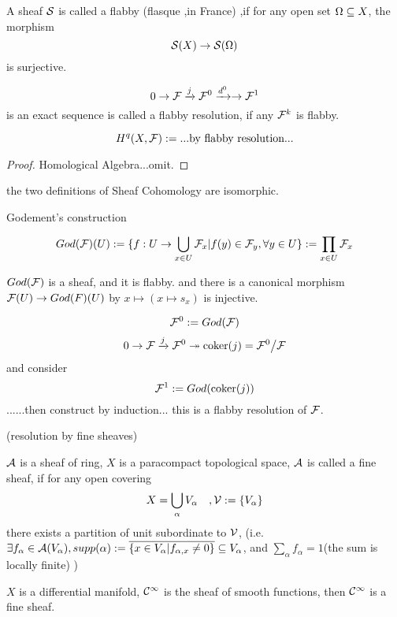 \begin{definition}
A sheaf $\mathcal{S}$ is called a flabby (flasque ,in France) ,if
for any open set $\Omega\subseteq X$, the morphism
$$\mathcal{S}(X)\to\mathcal{S}(\Omega)$$
is surjective.
\end{definition}

\begin{definition}
$$0\to\mathcal{F}\xrightarrow{j}\mathcal{F}^0\xrightarrow{d^0}\to\mathcal{F}^1$$
is an exact sequence is called a flabby resolution, if
any $\mathcal{F}^k$ is flabby.
\end{definition}

\begin{definition}
$$H^q(X,\mathcal{F}):=...\text{by flabby resolution...}$$
\end{definition}

\begin{proof}
Homological Algebra...omit.
\end{proof}

the two definitions of Sheaf Cohomology are isomorphic.


Godement's construction

$$God(\mathcal{F})(U):=
\{f:U\to\bigcup_{x\in U}\mathcal{F}_x|
f(y)\in\mathcal{F}_y,\forall y\in U\}
:=\prod_{x\in U}\mathcal{F}_x$$

$God(\mathcal{F})$ is a sheaf, and it is flabby. and there is a canonical
morphism $\mathcal{F}(U)\to God(F)(U)$ by $x\mapsto(x\mapsto s_x)$ is injective.

$$\mathcal{F}^0:=God(\mathcal{F})$$
$$0\to\mathcal{F}\xrightarrow{j}\mathcal{F}^0\twoheadrightarrow\operatorname{coker}(j)=\mathcal{F}^0\big/\mathcal{F}$$
and consider
$$\mathcal{F}^1:=God(\operatorname{coker}(j))$$
......then construct by induction... this is a flabby resolution of $\mathcal{F}$.

\begin{definition}(resolution by fine sheaves)

$\mathcal{A}$ is a sheaf of ring,
$X$ is a paracompact topological space, $\mathcal{A}$
is called a fine sheaf, if for any open covering
$$X=\bigcup_{\alpha}V_{\alpha}\quad,\mathcal{V}:=\{V_{\alpha}\}$$
there exists a partition of unit subordinate to $\mathcal{V}$,
(i.e. $\exists f_{\alpha}\in\mathcal{A}(V_{\alpha}),supp(\alpha)
:=\overline{\{x\in V_{\alpha}|f_{\alpha,x}\neq 0\}}\subseteq V_{\alpha}$, and
$\sum_{\alpha}f_{\alpha}=1$(the sum is locally finite)
 )
\end{definition}

\begin{example}
$X$ is a differential manifold,
$\mathcal{C}^{\infty}$ is the sheaf of smooth functions,
then $\mathcal{C}^{\infty}$ is a fine sheaf.
\end{example}

